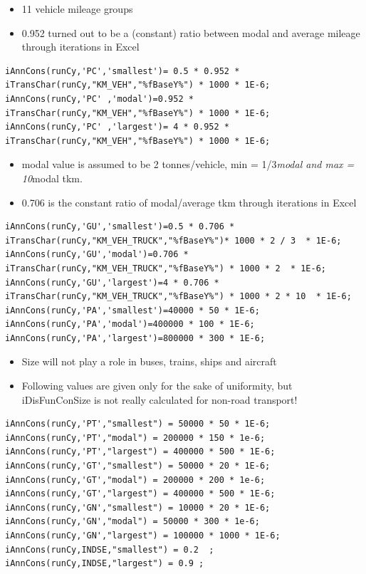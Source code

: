 \documentclass[a4paper,]{scrartcl}
\providecommand{\tightlist}{%
  \setlength{\itemsep}{0pt}\setlength{\parskip}{0pt}}
\begin{document}
\begin{itemize}
\tightlist
\item
  11 vehicle mileage groups
\item
  0.952 turned out to be a (constant) ratio between modal and average
  mileage through iterations in Excel
\end{itemize}

\begin{lstlisting}
iAnnCons(runCy,'PC','smallest')= 0.5 * 0.952 * iTransChar(runCy,"KM_VEH","%fBaseY%") * 1000 * 1E-6;
iAnnCons(runCy,'PC' ,'modal')=0.952 * iTransChar(runCy,"KM_VEH","%fBaseY%") * 1000 * 1E-6;
iAnnCons(runCy,'PC' ,'largest')= 4 * 0.952 * iTransChar(runCy,"KM_VEH","%fBaseY%") * 1000 * 1E-6;
\end{lstlisting}

\begin{itemize}
\tightlist
\item
  modal value is assumed to be 2 tonnes/vehicle, min = 1/3\emph{modal
  and max = 10}modal tkm.
\item
  0.706 is the constant ratio of modal/average tkm through iterations in
  Excel
\end{itemize}

\begin{lstlisting}
iAnnCons(runCy,'GU','smallest')=0.5 * 0.706 * iTransChar(runCy,"KM_VEH_TRUCK","%fBaseY%")* 1000 * 2 / 3  * 1E-6;
iAnnCons(runCy,'GU','modal')=0.706 * iTransChar(runCy,"KM_VEH_TRUCK","%fBaseY%") * 1000 * 2  * 1E-6;
iAnnCons(runCy,'GU','largest')=4 * 0.706 * iTransChar(runCy,"KM_VEH_TRUCK","%fBaseY%") * 1000 * 2 * 10  * 1E-6;
iAnnCons(runCy,'PA','smallest')=40000 * 50 * 1E-6;
iAnnCons(runCy,'PA','modal')=400000 * 100 * 1E-6;
iAnnCons(runCy,'PA','largest')=800000 * 300 * 1E-6;
\end{lstlisting}

\begin{itemize}
\tightlist
\item
  Size will not play a role in buses, trains, ships and aircraft
\item
  Following values are given only for the sake of uniformity, but
  iDisFunConSize is not really calculated for non-road transport!
\end{itemize}

\begin{lstlisting}
iAnnCons(runCy,'PT',"smallest") = 50000 * 50 * 1E-6;
iAnnCons(runCy,'PT',"modal") = 200000 * 150 * 1e-6;
iAnnCons(runCy,'PT',"largest") = 400000 * 500 * 1E-6;
iAnnCons(runCy,'GT',"smallest") = 50000 * 20 * 1E-6;
iAnnCons(runCy,'GT',"modal") = 200000 * 200 * 1e-6;
iAnnCons(runCy,'GT',"largest") = 400000 * 500 * 1E-6;
iAnnCons(runCy,'GN',"smallest") = 10000 * 20 * 1E-6;
iAnnCons(runCy,'GN',"modal") = 50000 * 300 * 1e-6;
iAnnCons(runCy,'GN',"largest") = 100000 * 1000 * 1E-6;
iAnnCons(runCy,INDSE,"smallest") = 0.2  ;
iAnnCons(runCy,INDSE,"largest") = 0.9 ;
\end{lstlisting}
\end{document}
